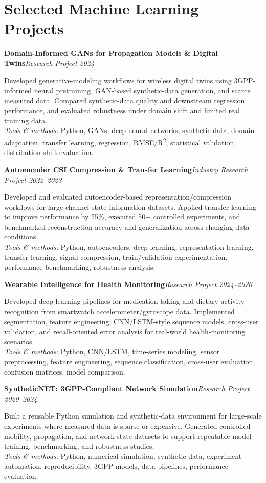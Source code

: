 \documentclass[10pt,letterpaper]{extarticle}
\newcommand{\project}[3]{\Needspace{3\baselineskip}\textbf{#1}\hfill\textit{#2 \textbar{} #3}\par}
\begin{document}
\section{Selected Machine Learning Projects}
\project{Domain-Informed GANs for Propagation Models \& Digital Twins}{Research Project}{2024}
Developed generative-modeling workflows for wireless digital twins using 3GPP-informed neural pretraining, GAN-based synthetic-data generation, and scarce measured data. Compared synthetic-data quality and downstream regression performance, and evaluated robustness under domain shift and limited real training data.\\[-1pt]
{\small\textit{Tools \& methods:} Python, GANs, deep neural networks, synthetic data, domain adaptation, transfer learning, regression, RMSE/R\textsuperscript{2}, statistical validation, distribution-shift evaluation.}

\project{Autoencoder CSI Compression \& Transfer Learning}{Industry Research Project}{2022--2023}
Developed and evaluated autoencoder-based representation/compression workflows for large channel-state-information datasets. Applied transfer learning to improve performance by 25\%, executed 50+ controlled experiments, and benchmarked reconstruction accuracy and generalization across changing data conditions.\\[-1pt]
{\small\textit{Tools \& methods:} Python, autoencoders, deep learning, representation learning, transfer learning, signal compression, train/validation experimentation, performance benchmarking, robustness analysis.}

\project{Wearable Intelligence for Health Monitoring}{Research Project}{2024--2026}
Developed deep-learning pipelines for medication-taking and dietary-activity recognition from smartwatch accelerometer/gyroscope data. Implemented segmentation, feature engineering, CNN/LSTM-style sequence models, cross-user validation, and recall-oriented error analysis for real-world health-monitoring scenarios.\\[-1pt]
{\small\textit{Tools \& methods:} Python, CNN/LSTM, time-series modeling, sensor preprocessing, feature engineering, sequence classification, cross-user evaluation, confusion matrices, model comparison.}

\project{SyntheticNET: 3GPP-Compliant Network Simulation}{Research Project}{2020--2024}
Built a reusable Python simulation and synthetic-data environment for large-scale experiments where measured data is sparse or expensive. Generated controlled mobility, propagation, and network-state datasets to support repeatable model training, benchmarking, and robustness studies.\\[-1pt]
{\small\textit{Tools \& methods:} Python, numerical simulation, synthetic data, experiment automation, reproducibility, 3GPP models, data pipelines, performance evaluation.}
\end{document}
